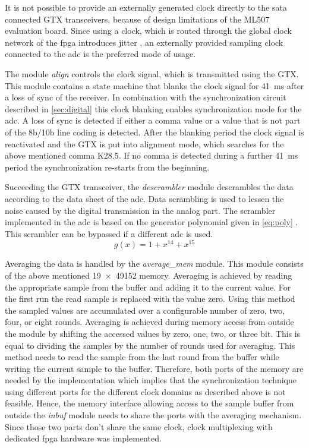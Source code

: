 \documentclass[12pt,a4paper,parskip=full,abstract=true,BCOR=12mm]{scrreprt}
\def\device#1{\mbox{\textit{#1}}}
\begin{document}
It is not possible to provide an externally generated clock directly to the
\gls{sata} connected GTX transceivers, because of design limitations of the ML507 evaluation
board. Since using a clock, which is routed through the global clock
network of the \gls{fpga} introduces jitter \cite{gtx}, an externally provided sampling clock
connected to the \gls{adc} is the preferred mode of usage.

The module \device{align} controls the clock signal, which is transmitted using
the GTX. This module contains a state machine that blanks the clock signal
for \SI{41}{\milli\second} after a loss of sync of the receiver. In combination with the
synchronization circuit described in \cref{sec:digital} this clock blanking
enables synchronization mode for the \gls{adc}. A loss of sync is
detected if either a comma value or a value that is not part of the 8b/10b line coding
is detected. After the blanking period the clock signal is reactivated and
the GTX is put into alignment mode, which searches for the above mentioned comma
K28.5. If no comma is detected during a further \SI{41}{\milli\second} period the
synchronization re-starts from the beginning.

Succeeding the GTX transceiver, the \device{descrambler} module descrambles the data
according to the data sheet of the \gls{adc}\cite{ltc2274}. Data scrambling is
used to lessen the noise caused by the digital transmission in the analog part. The
scrambler implemented in the \gls{adc} is based on the generator polynomial given
in \cref{eq:poly} \cite{jesd205B.01}. This scrambler can be bypassed if a
different \gls{adc} is used.
\begin{equation}
    \label{eq:poly} g(x) = 1 + x^{14} + x^{15}
\end{equation}

Averaging the data is handled by the \device{average\_mem} module. This module
consists of the above mentioned \SI[product-units=brackets]{19 x 49152}{\bit} memory. Averaging is achieved
by reading the appropriate sample from the buffer and adding it to the current value.
For the first run the read sample is replaced with the value zero. Using this method
the sampled values are accumulated over a configurable number of zero, two,
four, or eight rounds. Averaging is achieved during memory access from outside the module
by shifting the accessed values by zero, one, two, or three bit. This is equal to dividing
the samples by the number of rounds used for averaging. This method needs to read
the sample from the last round from the buffer while writing the current sample
to the buffer. Therefore, both ports of the memory are needed by the implementation which
implies that the synchronization technique using different ports for the different clock
domains as described above is not feasible. Hence, the memory interface allowing
access to the sample buffer from outside the \device{inbuf} module needs to share
the ports with the averaging mechanism. Since those two parts don't share the same
clock, clock multiplexing with dedicated \gls{fpga} hardware was implemented.
\end{document}
